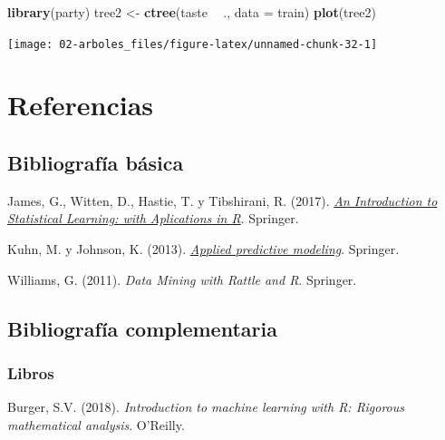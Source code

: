 \documentclass[]{book}
\newenvironment{Shaded}{\begin{snugshade}}{\end{snugshade}}
\newcommand{\KeywordTok}[1]{\textcolor[rgb]{0.13,0.29,0.53}{\textbf{#1}}}
\newcommand{\DataTypeTok}[1]{\textcolor[rgb]{0.13,0.29,0.53}{#1}}
\newcommand{\StringTok}[1]{\textcolor[rgb]{0.31,0.60,0.02}{#1}}
\newcommand{\OperatorTok}[1]{\textcolor[rgb]{0.81,0.36,0.00}{\textbf{#1}}}
\newcommand{\NormalTok}[1]{#1}
\theoremstyle{break}
\theoremstyle{definition}
\theoremstyle{definition}
\theoremstyle{definition}
\theoremstyle{remark}
\begin{document}
\begin{Shaded}
\begin{Highlighting}[]
\KeywordTok{library}\NormalTok{(party)}
\NormalTok{tree2 <-}\StringTok{ }\KeywordTok{ctree}\NormalTok{(taste }\OperatorTok{~}\StringTok{ }\NormalTok{., }\DataTypeTok{data =}\NormalTok{ train) }
\KeywordTok{plot}\NormalTok{(tree2)}
\end{Highlighting}
\end{Shaded}

\begin{center}\texttt{[image: 02-arboles\_files/figure-latex/unnamed-chunk-32-1]} \end{center}

\chapter*{Referencias}\label{referencias}

\section*{Bibliografía básica}\label{bibliografuxeda-buxe1sica}

James, G., Witten, D., Hastie, T. y Tibshirani, R. (2017).
\emph{\href{http://faculty.marshall.usc.edu/gareth-james/ISL}{An
Introduction to Statistical Learning: with Aplications in R}}. Springer.

Kuhn, M. y Johnson, K. (2013).
\emph{\href{http://appliedpredictivemodeling.com}{Applied predictive
modeling}}. Springer.

Williams, G. (2011). \emph{Data Mining with Rattle and R}. Springer.

\section*{Bibliografía
complementaria}\label{bibliografuxeda-complementaria}

\subsection*{Libros}\label{libros}

Burger, S.V. (2018). \emph{Introduction to machine learning with R:
Rigorous mathematical analysis}. O'Reilly.
\end{document}
